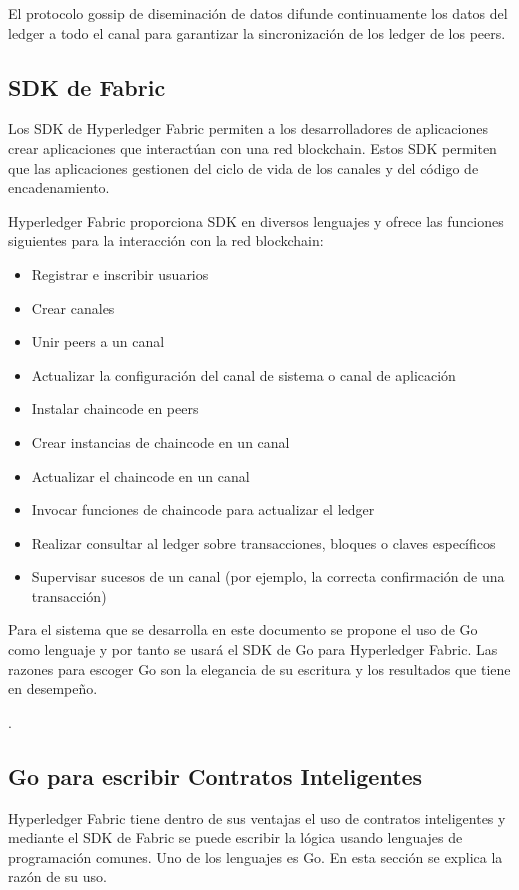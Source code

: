 El protocolo gossip de diseminación de datos difunde continuamente los datos del ledger a todo el canal para garantizar la sincronización de los ledger de los peers.

\subsection{SDK de Fabric}
Los SDK de Hyperledger Fabric permiten a los desarrolladores de aplicaciones crear aplicaciones que interactúan con una red blockchain. Estos SDK permiten que las aplicaciones gestionen del ciclo de vida de los canales y del código de encadenamiento.

Hyperledger Fabric proporciona SDK en diversos lenguajes y ofrece las funciones siguientes para la interacción con la red blockchain:

\begin{itemize}
	\item Registrar e inscribir usuarios
	\item Crear canales
	\item Unir peers a un canal
	\item Actualizar la configuración del canal de sistema o canal de aplicación
	\item Instalar chaincode en peers
	\item Crear instancias de chaincode en un canal
	\item Actualizar el chaincode en un canal
	\item Invocar funciones de chaincode para actualizar el ledger
	\item Realizar consultar al ledger sobre transacciones, bloques o claves específicos
	\item Supervisar sucesos de un canal (por ejemplo, la correcta confirmación de una transacción)
\end{itemize}

Para el sistema que se desarrolla en este documento se propone el uso de Go como lenguaje y por tanto se usará el SDK de Go para Hyperledger Fabric. Las razones para escoger Go son la elegancia de su escritura y los resultados que tiene en desempeño.

.

\subsection{Go para escribir Contratos Inteligentes}

Hyperledger Fabric tiene dentro de sus ventajas el uso de contratos inteligentes y mediante el SDK de Fabric se puede escribir la lógica usando lenguajes de programación comunes. Uno de los lenguajes es Go. En esta sección se explica la razón de su uso.

